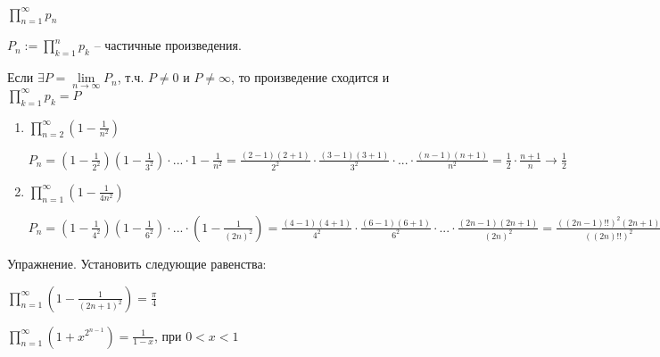 
\begin{definition}\slashns
	
	$\prod\limits_{n=1}^{\infty} p_n$
	
	$P_n := \prod\limits_{k=1}^{n} p_k$ -- частичные произведения.
	
	Если $\exists P = \lim\limits_{n \to \infty} P_n$, т.ч. $P\ne 0$ и $P \ne \infty$, то произведение сходится и $\prod\limits_{k = 1}^{\infty}p_k = P$
\end{definition}

\begin{example}\slashns
	
	\begin{enumerate}
		\item $\prod\limits_{n=2}^{\infty}(1 - \frac1{n^2})$
		
		$P_n = (1 - \frac1{2^2})(1 - \frac1{3^2})\cdot ...\cdot 1 - \frac1{n^2} = \frac{(2-1)(2+1)}{2^2}\cdot \frac{(3-1)(3+1)}{3^2}\cdot...\cdot \frac{(n-1)(n+1)}{n^2} = \frac12 \cdot \frac{n+1}{n} \to \frac12$
		
		\item $\prod\limits_{n=1}^{\infty}(1 - \frac1{4n^2})$
		
		$P_n = (1-\frac1{4^2}) (1 - \frac1{6^2})\cdot ...\cdot(1 - \frac1{(2n)^2}) = \frac{(4-1)(4+1)}{4^2}\cdot \frac{(6-1)(6+1)}{6^2}\cdot ...\cdot \frac{(2n-1)(2n+1)}{(2n)^2} = \frac{((2n-1)!!)^2(2n+1)}{((2n)!!)^2} \to \frac2{\pi}$
	\end{enumerate}
\end{example}

Упражнение. Установить следующие равенства:

$\prod\limits_{n = 1}^{\infty} (1 - \frac1{(2n+1)^2}) = \frac{\pi}{4}$

$\prod\limits_{n = 1}^{\infty} (1 + x^{2^{n-1}}) = \frac1{1-x}$, при $0 < x < 1$


